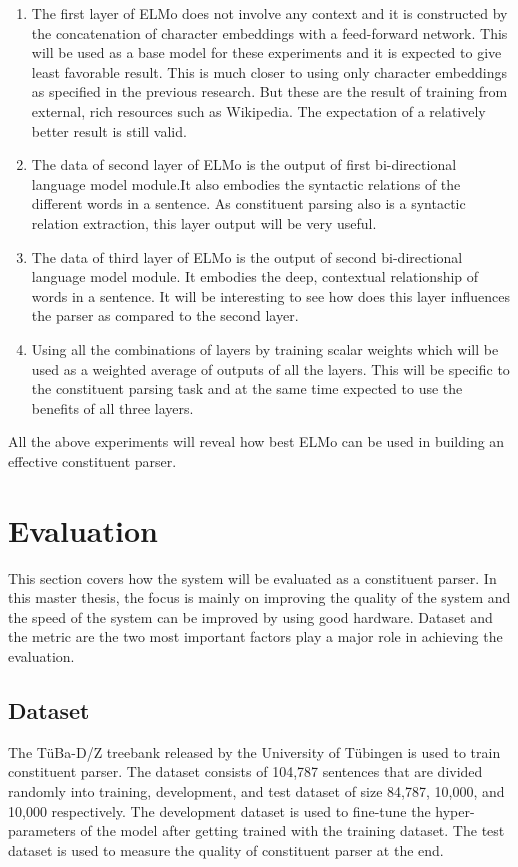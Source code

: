 \documentclass[a4paper, 11pt]{article}
\begin{document}
\begin{enumerate}
\item The first layer of ELMo does not involve any context and it is constructed by the concatenation of character embeddings with a feed-forward network. This will be used as a base model for these experiments and it is expected to give least favorable result. This is much closer to using only character embeddings as specified in the previous research. But these are the result of training from external, rich resources such as Wikipedia. The expectation of a relatively better result is still valid.
\item The data of second layer of ELMo is the output of first bi-directional language model module.It also embodies the syntactic relations of the different words in a sentence. As constituent parsing also is a syntactic relation extraction, this layer output will be very useful. 
\item The data of third layer of ELMo is the output of second bi-directional language model module. It embodies the deep, contextual relationship of words in a sentence. It will be interesting to see how does this layer influences the parser as compared to the second layer.   
\item Using all the combinations of layers by training scalar weights which will be used as a weighted average of outputs of all the layers. This will be specific to the constituent parsing task and at the same time expected to use the benefits of all three layers. 
\end{enumerate}

All the above experiments will reveal how best ELMo can be used in building an effective constituent parser. 


\pagebreak
\section{Evaluation}

This section covers how the system will be evaluated as a constituent parser. In this master thesis, the focus is mainly on improving the quality of the system and the speed of the system can be improved by using good hardware. Dataset and the metric are the two most important factors play a major role in achieving the evaluation. 
\subsection{Dataset}

The TüBa-D/Z treebank \parencite{TubingenTreebank} released by the University of Tübingen is used to train constituent parser. The dataset consists of 104,787 sentences that are divided randomly into training, development, and test dataset of size 84,787, 10,000, and 10,000 respectively. The development dataset is used to fine-tune the hyper-parameters of the model after getting trained with the training dataset. The test dataset is used to measure the quality of constituent parser at the end. 
\end{document}
